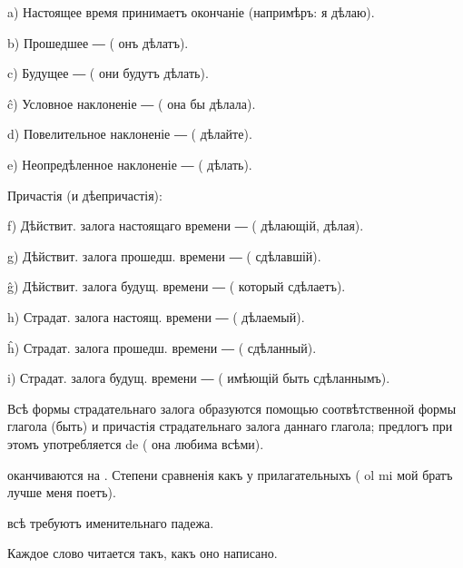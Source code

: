         a) Настоящее время принимаетъ окончаніе  (напримѣръ:  я дѣлаю).
        
        b) Прошедшее ―  ( онъ дѣлатъ).
        
        c) Будущее ―  ( они будутъ дѣлать).
        
        ĉ) Условное наклоненіе ―  ( она бы дѣлала).
        
        d) Повелительное наклоненіе ―  ( дѣлайте).
        
        e) Неопредѣленное наклоненіе ―  ( дѣлать).
        
\begin{center}
Причастія (и дѣепричастія):
\end{center}
    
        f) Дѣйствит. залога настоящаго времени ―  ( дѣлающій,  дѣлая).
        
        g) Дѣйствит. залога прошедш. времени ―  ( сдѣлавшій).
        
        ĝ) Дѣйствит. залога будущ. времени ―  ( который сдѣлаетъ).
        
        h) Страдат. залога настоящ. времени ―  ( дѣлаемый).
        
        ĥ) Страдат. залога прошедш. времени ―  ( сдѣланный).
        
        i) Страдат. залога будущ. времени ―  ( имѣющій быть сдѣланнымъ).

    Всѣ формы страдательнаго залога образуются помощью соотвѣтственной формы глагола  (быть) и причастія страдательнаго залога даннаго глагола; предлогъ при этомъ употребляется de (  она любима всѣми).
    
     оканчиваются на . Степени сравненія какъ у прилагательныхъ (  ol mi мой братъ лучше меня поетъ).
    
     всѣ требуютъ именительнаго падежа.

\begin{samepage} 
\begin{center}
{\large{} }
\end{center}

     Каждое слово читается такъ, какъ оно написано.
\end{samepage}


